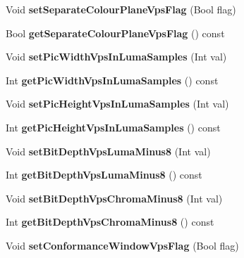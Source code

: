 \begin{DoxyCompactItemize}
Void {\bfseries set\+Separate\+Colour\+Plane\+Vps\+Flag} (Bool flag)
\item 
\mbox{\label{class_t_com_rep_format_a35df9660c441fdcccc7039c0dfc1ec2d}} 
Bool {\bfseries get\+Separate\+Colour\+Plane\+Vps\+Flag} () const
\item 
\mbox{\label{class_t_com_rep_format_ac2276d28614978c103b6e8d6b95ba63b}} 
Void {\bfseries set\+Pic\+Width\+Vps\+In\+Luma\+Samples} (Int val)
\item 
\mbox{\label{class_t_com_rep_format_a6107c54748bafaa3dd20888add687b35}} 
Int {\bfseries get\+Pic\+Width\+Vps\+In\+Luma\+Samples} () const
\item 
\mbox{\label{class_t_com_rep_format_a12c97ace85e7bf36d6c6cfb489b197d2}} 
Void {\bfseries set\+Pic\+Height\+Vps\+In\+Luma\+Samples} (Int val)
\item 
\mbox{\label{class_t_com_rep_format_a1ce46f9f09e108b813496ac6430267e6}} 
Int {\bfseries get\+Pic\+Height\+Vps\+In\+Luma\+Samples} () const
\item 
\mbox{\label{class_t_com_rep_format_a5d6e37c6dd591d7b87748c360f3ba7da}} 
Void {\bfseries set\+Bit\+Depth\+Vps\+Luma\+Minus8} (Int val)
\item 
\mbox{\label{class_t_com_rep_format_aad587894a66fab385568babef04e49e9}} 
Int {\bfseries get\+Bit\+Depth\+Vps\+Luma\+Minus8} () const
\item 
\mbox{\label{class_t_com_rep_format_a34fd41a5c1a16d5451ff736a7e82eb24}} 
Void {\bfseries set\+Bit\+Depth\+Vps\+Chroma\+Minus8} (Int val)
\item 
\mbox{\label{class_t_com_rep_format_aa50543046f63789a7435005039f481cf}} 
Int {\bfseries get\+Bit\+Depth\+Vps\+Chroma\+Minus8} () const
\item 
\mbox{\label{class_t_com_rep_format_a43822669b13765bfa620f435a5a820e9}} 
Void {\bfseries set\+Conformance\+Window\+Vps\+Flag} (Bool flag)

\end{DoxyCompactItemize}

